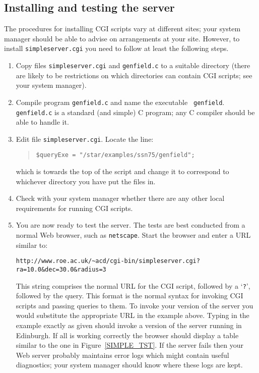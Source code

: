 \documentclass[twoside,11pt]{article}
\renewcommand{\_}{\texttt{\symbol{95}}}
\begin{document}
\subsection{Installing and testing the server}

The procedures for installing CGI scripts vary at different sites; your
system manager should be able to advise on arrangements at your site.
However, to install {\tt simpleserver.cgi} you need to follow at least
the following steps.

\begin{enumerate}

  \item Copy files {\tt simpleserver.cgi} and {\tt genfield.c} to a
   suitable directory (there are likely to be restrictions on which
   directories can contain CGI scripts; see your system manager).

  \item Compile program {\tt genfield.c} and name the executable {\tt
   genfield}.  {\tt genfield.c} is a standard (and simple) C program;
   any C compiler should be able to handle it.

  \item Edit file {\tt simpleserver.cgi}.  Locate the line:

  \begin{quote}
   \verb-$queryExe = "/star/examples/ssn75/genfield";-
  \end{quote}

   which is towards the top of the script and change it to correspond
   to whichever directory you have put the files in.

  \item Check with your system manager whether there are any other
   local requirements for running CGI scripts.

  \item You are now ready to test the server.  The tests are best conducted
   from a normal Web browser, such as {\tt netscape}.  Start the browser
   and enter a URL similar to:

  \begin{verbatim}
http://www.roe.ac.uk/~acd/cgi-bin/simpleserver.cgi?ra=10.0&dec=30.0&radius=3
  \end{verbatim}

   This string comprises the normal URL for the CGI script, followed
   by a `{\tt ?}', followed by the query.  This format is the normal
   syntax for invoking CGI scripts and passing queries to them.  To
   invoke your version of the server you would substitute the appropriate
   URL in the example above.  Typing in the example exactly as given
   should invoke a version of the server running in Edinburgh.  If
   all is working correctly the browser should display a table similar
   to the one in Figure~\ref{SIMPLE_TST}.  If the server fails then
   your Web server probably maintains error logs which might contain
   useful diagnostics; your system manager should know where these logs
   are kept.

\end{enumerate}
\end{document}
